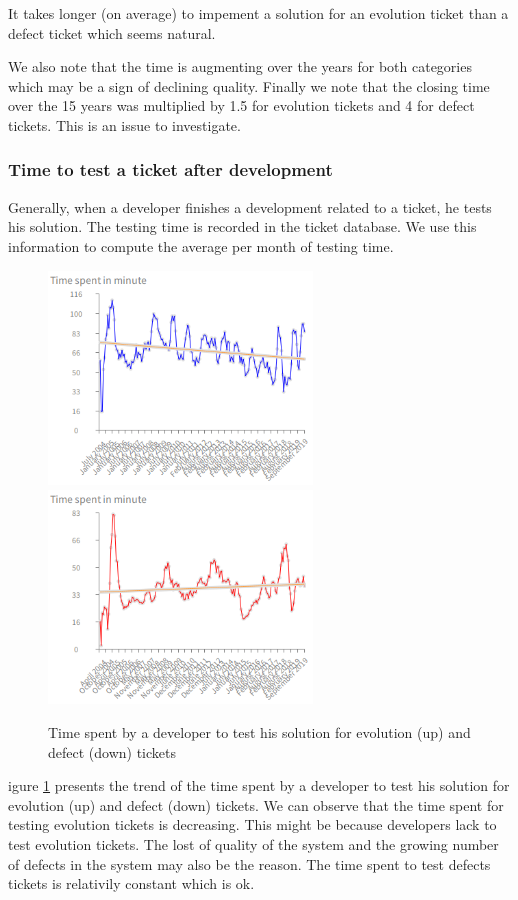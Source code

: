 \documentclass[10pt,conference]{IEEEtran}
\begin{document}
It takes longer (on average) to impement a solution for an evolution ticket than a defect ticket which seems natural.

We also note that the time is augmenting over the years for both categories which may be a sign of declining quality.
Finally we note that the closing time over the 15 years was multiplied by 1.5 for evolution tickets and 4 for defect tickets.
This is an issue to investigate.
\subsubsection{Time  to test a ticket after development}

Generally, when a developer finishes a development related to a ticket, he tests his solution.  
The testing time is recorded in the ticket database.
 We use this information to compute the average per month of testing time. 


 \begin{figure}[htbp]
  \centering
  \includegraphics[width=70mm]{./images/evolutionTest.png} \\
  \includegraphics[width=70mm]{./images/timeDevTest.png}
  \caption{Time spent by a developer to test his solution for  evolution (up) and defect (down) tickets}
  \label{fig:devTimeTest}
\end{figure}
igure \ref{fig:devTimeTest} presents the trend of the time spent by a developer to test his solution for evolution (up) and defect (down) tickets.
We can observe that the time spent for testing evolution tickets is decreasing. 
This might be because developers lack to test evolution tickets. The lost of quality of the system and the growing number of defects  in the system may also be the reason.
The time spent to test defects tickets is relativily constant which is ok.
 
\end{document}
